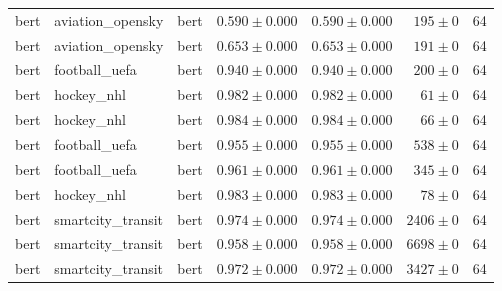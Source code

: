 \begin{table}[htbp]
\begin{tabular}{l l l r r r r}
bert & aviation\_opensky & bert & $0.590\pm0.000$ & $0.590\pm0.000$ & $195\pm0$ & 64 \\
bert & aviation\_opensky & bert & $0.653\pm0.000$ & $0.653\pm0.000$ & $191\pm0$ & 64 \\
bert & football\_uefa & bert & $0.940\pm0.000$ & $0.940\pm0.000$ & $200\pm0$ & 64 \\
bert & hockey\_nhl & bert & $0.982\pm0.000$ & $0.982\pm0.000$ & $61\pm0$ & 64 \\
bert & hockey\_nhl & bert & $0.984\pm0.000$ & $0.984\pm0.000$ & $66\pm0$ & 64 \\
bert & football\_uefa & bert & $0.955\pm0.000$ & $0.955\pm0.000$ & $538\pm0$ & 64 \\
bert & football\_uefa & bert & $0.961\pm0.000$ & $0.961\pm0.000$ & $345\pm0$ & 64 \\
bert & hockey\_nhl & bert & $0.983\pm0.000$ & $0.983\pm0.000$ & $78\pm0$ & 64 \\
bert & smartcity\_transit & bert & $0.974\pm0.000$ & $0.974\pm0.000$ & $2406\pm0$ & 64 \\
bert & smartcity\_transit & bert & $0.958\pm0.000$ & $0.958\pm0.000$ & $6698\pm0$ & 64 \\
bert & smartcity\_transit & bert & $0.972\pm0.000$ & $0.972\pm0.000$ & $3427\pm0$ & 64 \\
\hline
\end{tabular}
\end{table}
